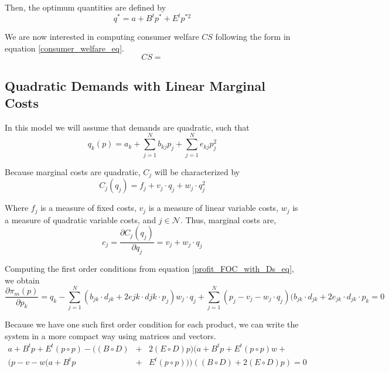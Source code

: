 \documentclass[12pt]{article}
\begin{document}
Then, the optimum quantities are defined by 
\begin{equation*}
q^* = a + B^t p^* + E^t p^{*2}
\end{equation*}

We are now interested in computing consumer welfare $CS$ following the form in equation \ref{consumer_welfare_eq}.
\begin{equation*}
CS = 
\end{equation*}

\subsection{Quadratic Demands with Linear Marginal Costs}

In this model we will assume that demands are quadratic, such that
\begin{equation*}
q_k(p) = a_k + \sum_{j = 1}^N b_{kj} p_j + \sum_{j = 1}^N e_{kj}p_j^2
\end{equation*}

Because marginal costs are quadratic, $C_j$ will be characterized by
\begin{equation*}
C_j(q_j) = f_j + v_j \cdot q_j + w_j \cdot q_j^2
\end{equation*}

Where $f_j$ is a measure of fixed costs, $v_j$ is a measure of linear variable costs, $w_j$ is a measure of quadratic variable costs, and $j \in \mathcal{N}$. Thus, marginal costs are,
\begin{equation*}
c_j = \frac{\partial C_j(q_j)}{\partial q_j}= v_j + w_j \cdot q_j
\end{equation*}

Computing the first order conditions from equation \ref{profit_FOC_with_Ds_eq}, we obtain
\begin{equation*}
\frac{\partial \pi_m(p)}{\partial p_k} = q_k - \sum_{j = 1}^N (b_{jk} \cdot d_{jk} + 2e{jk} \cdot d{jk} \cdot p_j) w_j \cdot q_j + \sum_{j = 1}^N (p_j - v_j - w_j \cdot q_j)(b_{jk} \cdot d_{jk} + 2e_{jk} \cdot d_{jk} \cdot p_k = 0
\end{equation*}

Because we have one such first order condition for each product, we can write the system in a more compact way using matrices and vectors. 
\begin{eqnarray*}
a + B^t p + E^t (p \circ p) - ((B \circ D) &+& 2(E \circ D)p) (a + B^t p + E^t (p \circ p) w + \\
(p - v - w(a + B^t p &+& E^t (p \circ p)))((B \circ D) + 2 (E \circ D) p) = 0
\end{eqnarray*}
\end{document}
